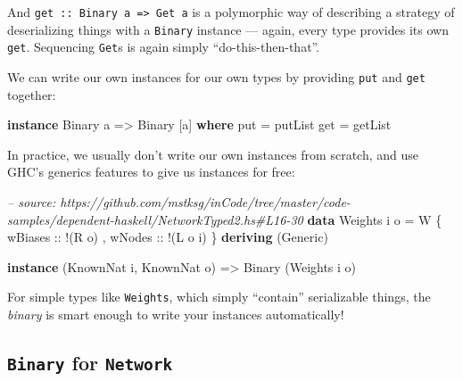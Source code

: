 \documentclass[]{article}
\newenvironment{Shaded}{}{}
\newcommand{\KeywordTok}[1]{\textcolor[rgb]{0.00,0.44,0.13}{\textbf{{#1}}}}
\newcommand{\DataTypeTok}[1]{\textcolor[rgb]{0.56,0.13,0.00}{{#1}}}
\newcommand{\CommentTok}[1]{\textcolor[rgb]{0.38,0.63,0.69}{\textit{{#1}}}}
\newcommand{\OtherTok}[1]{\textcolor[rgb]{0.00,0.44,0.13}{{#1}}}
\newcommand{\FunctionTok}[1]{\textcolor[rgb]{0.02,0.16,0.49}{{#1}}}
\newcommand{\NormalTok}[1]{{#1}}
\begin{document}
And \texttt{get\ ::\ Binary\ a\ =\textgreater{}\ Get\ a} is a polymorphic way of
describing a strategy of deserializing things with a \texttt{Binary} instance
--- again, every type provides its own \texttt{get}. Sequencing \texttt{Get}s is
again simply ``do-this-then-that''.

We can write our own instances for our own types by providing \texttt{put} and
\texttt{get} together:

\begin{Shaded}
\begin{Highlighting}[]
\KeywordTok{instance} \DataTypeTok{Binary} \NormalTok{a }\OtherTok{=>} \DataTypeTok{Binary} \NormalTok{[a] }\KeywordTok{where}
    \NormalTok{put }\FunctionTok{=} \NormalTok{putList}
    \NormalTok{get }\FunctionTok{=} \NormalTok{getList}
\end{Highlighting}
\end{Shaded}

In practice, we usually don't write our own instances from scratch, and use
GHC's generics features to give us instances for free:

\begin{Shaded}
\begin{Highlighting}[]
\CommentTok{-- source: https://github.com/mstksg/inCode/tree/master/code-samples/dependent-haskell/NetworkTyped2.hs#L16-30}
\KeywordTok{data} \DataTypeTok{Weights} \NormalTok{i o }\FunctionTok{=} \DataTypeTok{W} \NormalTok{\{}\OtherTok{ wBiases ::} \FunctionTok{!}\NormalTok{(}\DataTypeTok{R} \NormalTok{o)}
                     \NormalTok{,}\OtherTok{ wNodes  ::} \FunctionTok{!}\NormalTok{(}\DataTypeTok{L} \NormalTok{o i)}
                     \NormalTok{\}}
  \KeywordTok{deriving} \NormalTok{(}\DataTypeTok{Generic}\NormalTok{)}

\KeywordTok{instance} \NormalTok{(}\DataTypeTok{KnownNat} \NormalTok{i, }\DataTypeTok{KnownNat} \NormalTok{o) }\OtherTok{=>} \DataTypeTok{Binary} \NormalTok{(}\DataTypeTok{Weights} \NormalTok{i o)}
\end{Highlighting}
\end{Shaded}

For simple types like \texttt{Weights}, which simply ``contain'' serializable
things, the \emph{binary} is smart enough to write your instances automatically!

\subsection{\texorpdfstring{\texttt{Binary} for
\texttt{Network}}{Binary for Network}}\label{binary-for-network}
\end{document}
